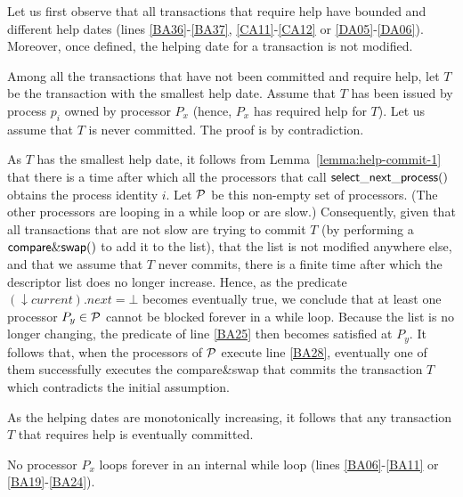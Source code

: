 \begin{proofL}
Let us first observe that all transactions that require help 
have bounded and different help dates  (lines \ref{BA36}-\ref{BA37}, 
 \ref{CA11}-\ref{CA12}  or \ref{DA05}-\ref{DA06}).  
Moreover,  once defined, the helping date for a transaction is not modified. 

Among all the transactions that  have not been committed and require help,
let  $T$  be the transaction with the smallest help date. 
Assume that  $T$ has been issued  by  process  $p_i$ owned  by processor
$P_x$  (hence,  $P_x$ has required  help for  $T$).  
Let us assume that $T$ is never committed. The proof  is by  contradiction. 


As $T$ has the smallest help date, it follows from 
Lemma~\ref{lemma:help-commit-1}  
that there is a time after  which all the processors that call 
${\sf select\_next\_process}()$  obtains the process identity $i$.
Let $\cal P$ be this non-empty set of processors. 
(The other processors are looping  in  a while loop or are slow.) 
Consequently, given that all transactions that are not slow are trying 
to commit  $T$ (by performing  a ${\sf compare\&swap}()$  to add it  to the
list), that the list is not modified anywhere else, and that we assume 
that $T$ never commits, there is a  finite time after which the descriptor 
list does no longer  increase. Hence, as  the  predicate  $(\downarrow
current).next=\bot$ becomes eventually true,  we conclude that at least one  
processor $P_y \in \cal P$ cannot 
be  blocked  forever in a  while  loop. Because the list is no
longer  changing, the predicate of line  \ref{BA25} then becomes 
satisfied at $P_y$.
It follows that,  when  the processors  of  $\cal P$ execute line \ref{BA28}, 
eventually one of them successfully executes the compare\&swap that commits 
the transaction $T$ which contradicts the initial assumption. 

As the helping dates are monotonically increasing, it follows that
any  transaction $T$ that requires help is eventually committed. 
\renewcommand{\toto}{lemma:helped-transaction}
\end{proofL}


\begin{lemma}
\label{lemma:no-infinite-loop}
No processor $P_x$ loops forever in an internal while loop
(lines \ref{BA06}-\ref{BA11} or  \ref{BA19}-\ref{BA24}). 
\end{lemma}

